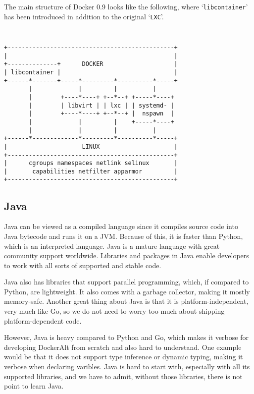 \documentclass[letterpaper,twocolumn,10pt]{article}
\begin{document}
The main structure of Docker 0.9 looks like the following, where `{\tt libcontainer}' has been introduced in addition to the original `{\tt LXC}'.
{\tt \small
\begin{verbatim}
+-----------------------------------------------+
|                                               |
+--------------+      DOCKER                    |
| libcontainer |                                |
+------*-------+-----*---------*----------*-----+
       |             |         |          |
       |        +----*----+ +--*--+ +-----*----+
       |        | libvirt | | lxc | | systemd- |
       |        +----*----+ +--*--+ |  nspawn  |
       |             |         |    +-----*----+
       |             |         |          |
+------*-------------*---------*----------*-----+
|                     LINUX                     |
+-----------------------------------------------+
|      cgroups namespaces netlink selinux       |
|       capabilities netfilter apparmor         |
+-----------------------------------------------+
\end{verbatim}
}

\subsection{Java}

Java can be viewed as a compiled language since it compiles source code into Java bytecode and runs it on a JVM. Because of this, it is faster than Python, which is an interpreted language. Java is a mature language with great community support worldwide. Libraries and packages in Java enable developers to work with all sorts of supported and stable code.

Java also has libraries that support parallel programming, which, if compared to Python, are lightweight. It also comes with a garbage collector, making it mostly memory-safe. Another great thing about Java is that it is platform-independent, very much like Go, so we do not need to worry too much about shipping platform-dependent code.

However, Java is heavy compared to Python and Go, which makes it verbose for developing DockerAlt from scratch and also hard to understand. One example would be that it does not support type inference or dynamic typing, making it verbose when declaring varibles. Java is hard to start with, especially with all its supported libraries, and we have to admit, without those libraries, there is not point to learn Java.
\end{document}
